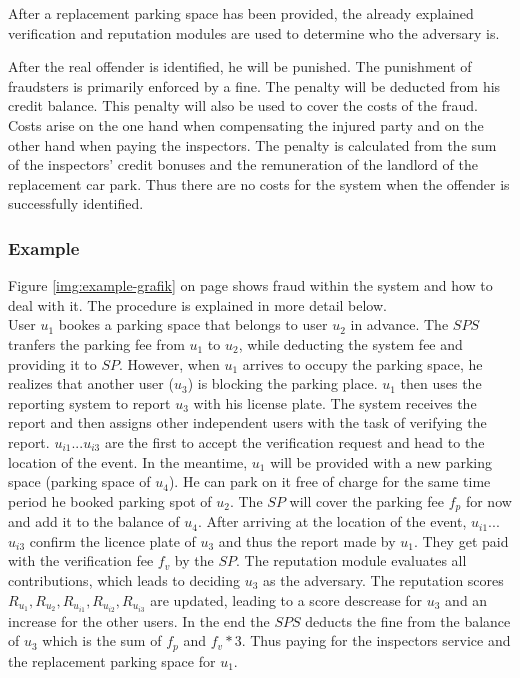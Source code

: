 \documentclass[
a4paper,     %
titlepage,   %
14pt         %
]{scrartcl}  %
\theoremstyle{mystyle}
\begin{document}
After a replacement parking space has been provided, the already explained verification and reputation modules are used to determine who the adversary is.

After the real offender is identified, he will be punished. The punishment of fraudsters is primarily enforced by a fine. The penalty will be deducted from his credit balance. This penalty will also be used to cover the costs of the fraud. Costs arise on the one hand when compensating the injured party and on the other hand when paying the inspectors. The penalty is calculated from the sum of the inspectors' credit bonuses and the remuneration of the landlord of the replacement car park. Thus there are no costs for the system when the offender is successfully identified.

\subsubsection{Example}
Figure \ref{img:example-grafik} on page \pageref{img:example-grafik} shows fraud within the system and how to deal with it. The procedure is explained in more detail below.\\

User $u_1$ bookes a parking space that belongs to user $u_2$ in advance. The $SPS$ tranfers the parking fee from $u_1$ to $u_2$, while deducting the system fee and providing it to $SP$. However, when $u_1$ arrives to occupy the parking space, he realizes that another user ($u_3$) is blocking the parking place. $u_1$ then uses the reporting system to report $u_3$ with his license plate. The system receives the report and then assigns other independent users with the task of verifying the report. $u_{i1}$...$u_{i3}$ are the first to accept the verification request and head to the location of the event. In the meantime, $u_1$ will be provided with a new parking space (parking space of $u_4$). He can park on it free of charge for the same time period he booked parking spot of $u_2$. The $SP$ will cover the parking fee $f_p$ for now and add it to the balance of $u_4$. After arriving at the location of the event, $u_{i1}$...$u_{i3}$ confirm the licence plate of $u_3$ and thus the report made by $u_1$. They get paid with the verification fee $f_v$ by the $SP$. The reputation module evaluates all contributions, which leads to deciding $u_3$ as the adversary. The reputation scores $R_{u_1}, R_{u_2}, R_{u_{i1}}, R_{u_{i2}}, R_{u_{i3}} $ are updated, leading to a score descrease for $u_3$ and an increase for the other users. In the end the $SPS$ deducts the fine from the balance of $u_3$ which is the sum of $f_p$ and $f_v * 3$. Thus paying for the inspectors service and the replacement parking space for $u_1$. \\
\end{document}
